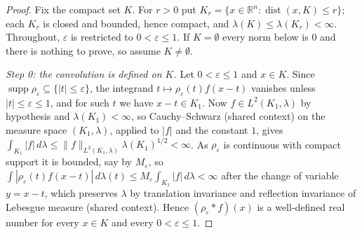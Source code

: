 \begin{proof}
Fix the compact set $K$.  For $r > 0$ put
$K_r = \{x \in \mathbb{R}^n : \operatorname{dist}(x,K) \leq r\}$; each $K_r$ is
closed and bounded, hence compact, and $\lambda(K) \leq \lambda(K_r) < \infty$.
Throughout, $\varepsilon$ is restricted to $0 < \varepsilon \leq 1$.  If
$K = \emptyset$ every norm below is $0$ and there is nothing to prove, so assume
$K \neq \emptyset$.

\emph{Step 0: the convolution is defined on $K$.}
Let $0 < \varepsilon \leq 1$ and $x \in K$.  Since
$\operatorname{supp}\rho_\varepsilon \subseteq \{|t|\leq\varepsilon\}$, the
integrand $t \mapsto \rho_\varepsilon(t) f(x-t)$ vanishes unless
$|t| \leq \varepsilon \leq 1$, and for such $t$ we have $x - t \in K_1$.  Now
$f \in L^2(K_1,\lambda)$ by hypothesis and $\lambda(K_1) < \infty$, so
Cauchy--Schwarz (shared context) on the measure space $(K_1,\lambda)$, applied to
$|f|$ and the constant $1$, gives
$\int_{K_1}|f|\,d\lambda \leq \|f\|_{L^2(K_1,\lambda)}\lambda(K_1)^{1/2} < \infty$.
As $\rho_\varepsilon$ is continuous with compact support it is bounded, say by
$M_\varepsilon$, so
$\int |\rho_\varepsilon(t) f(x-t)|\,d\lambda(t) \leq M_\varepsilon \int_{K_1}|f|\,d\lambda < \infty$
after the change of variable $y = x-t$, which preserves $\lambda$ by translation
invariance and reflection invariance of Lebesgue measure (shared context).  Hence
$(\rho_\varepsilon * f)(x)$ is a well-defined real number for every $x \in K$ and
every $0 < \varepsilon \leq 1$.


\end{proof}
